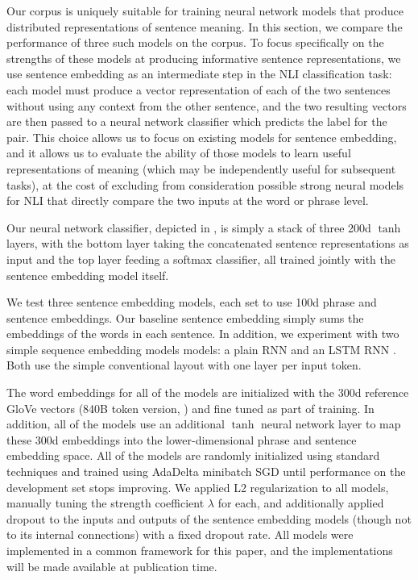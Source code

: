 Our corpus is uniquely suitable for training neural network models that produce distributed representations of sentence meaning. In this section, we compare the performance of three such models on the corpus. 
To focus specifically on the strengths of these models at producing informative sentence representations, we use sentence embedding as an intermediate step in the NLI classification task: each model must produce a vector representation of each of the two sentences without using any context from the other sentence, and the two resulting vectors are then passed to a neural network classifier which predicts the label for the pair. This choice allows us to focus on existing models for sentence embedding, and it allows us to evaluate the ability of those models to learn useful representations of meaning (which may be independently useful for subsequent tasks), at the cost of excluding from consideration possible strong neural models for NLI that directly compare the two inputs at the word or phrase level.



Our neural network classifier, depicted in , is simply a stack of three 200d $\tanh$ layers, with the bottom layer taking the concatenated sentence representations as input and the top layer feeding a softmax classifier, all trained jointly with the sentence embedding model itself.

We test three sentence embedding models, each set to use 100d phrase and sentence embeddings. Our baseline sentence embedding simply sums the embeddings of the words in each sentence. In addition, we experiment with two simple sequence embedding models models: a plain RNN and an LSTM RNN \cite{hochreiter1997long}. Both use the simple conventional layout with one layer per input token.

The word embeddings for all of the models are initialized with the 300d reference GloVe vectors (840B token version, \citealt{pennington2014glove}) and fine tuned as part of training. In addition, all of the models use an additional $\tanh$ neural network layer to map these 300d embeddings into the lower-dimensional phrase and sentence embedding space. All of the models are randomly initialized using standard techniques and trained using AdaDelta \cite{zeiler2012adadelta} minibatch SGD until performance on the development set stops improving. We applied L2 regularization to all models, manually tuning the strength coefficient $\lambda$ for each, and additionally applied dropout \cite{srivastava2014dropout} to the inputs and outputs of the sentence embedding models (though not to its internal connections) with a fixed dropout rate. All models were implemented in a common framework for this paper, and the implementations will be made available at publication time.

